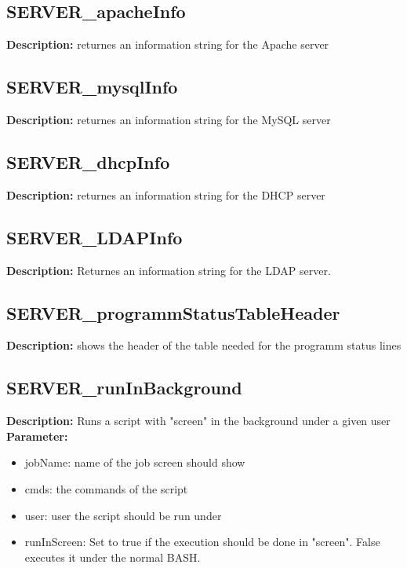 \subsection{SERVER\_apacheInfo}
\textbf{Description:} returnes an information string for the Apache server\\

\subsection{SERVER\_mysqlInfo}
\textbf{Description:} returnes an information string for the MySQL server\\

\subsection{SERVER\_dhcpInfo}
\textbf{Description:} returnes an information string for the DHCP server\\

\subsection{SERVER\_LDAPInfo}
\textbf{Description:} Returnes an information string for the LDAP server.\\

\subsection{SERVER\_programmStatusTableHeader}
\textbf{Description:} shows the header of the table needed for the programm status lines\\

\subsection{SERVER\_runInBackground}
\textbf{Description:} Runs a script with "screen" in the background under a given user\\
\textbf{Parameter:}
\begin{itemize}
\item jobName: name of the job screen should show
\item cmds: the commands of the script 
\item user: user the script should be run under
\item runInScreen: Set to true if the execution should be done in "screen". False executes it under the normal BASH.
\end{itemize}

